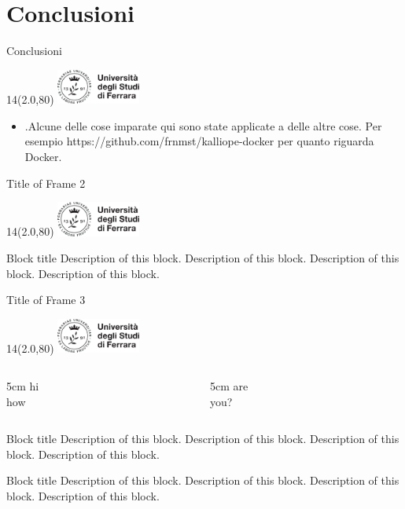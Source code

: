 \documentclass[11pt,xcolor={dvipsnames},default]{beamer} %
\newcommand{\MyLogo}{%
\begin{textblock}{14}(2.0,80)
 \includegraphics[height=1.15cm, angle=0]{logo}
\end{textblock}
}
\begin{document}
\section{Conclusioni}
\begin{frame}{Conclusioni}
\transboxin
\MyLogo
\begin{itemize}
\item .Alcune delle cose imparate qui sono state applicate a delle altre cose.
Per esempio https://github.com/frnmst/kalliope-docker per quanto riguarda 
Docker.
\end{itemize}
\end{frame}






\iffalse
\begin{frame}{Title of Frame 2}
\MyLogo
\begin{center}
\begin{alertblock}{Block title}
Description of this block. Description of this block. Description of this block. Description of this block. \\
\end{alertblock}
\vspace{0.8cm}
\end{center}
\end{frame}

\begin{frame}{Title of Frame 3}
\MyLogo
\begin{columns}
\begin{column}[T]{5cm}
hi \\ how
\end{column}
\begin{column}[T]{5cm}
are \\ you?
\end{column}
\end{columns}
\begin{block}{Block title}
Description of this block. Description of this block. Description of this block. Description of this block.
\end{block}
\bigskip \bigskip
\begin{block}{Block title}
Description of this block. Description of this block. Description of this block. Description of this block.
\end{block}
\end{frame}
\end{document}
